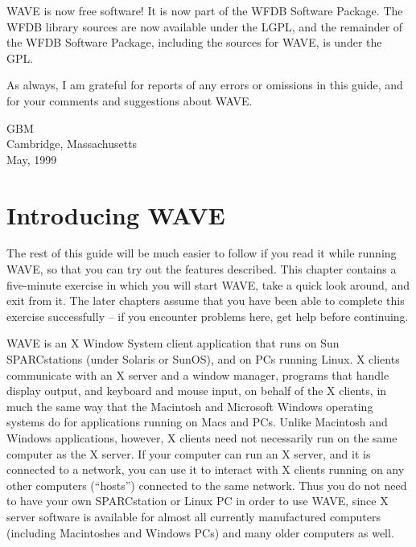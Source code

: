 \documentclass[twoside]{book}
\newcommand{\WAVE}{{\sf WAVE}\xspace}
\begin{document}
\WAVE{} is now free software!  It is now part of the WFDB Software
Package.  The WFDB library sources are now available under the LGPL,
and the remainder of the WFDB Software Package, including the sources
for \WAVE{}, is under the GPL.

As always, I am grateful for reports of any errors or omissions in this
guide, and for your comments and suggestions about \WAVE{}.

\vspace{2em}
\noindent
GBM\\
Cambridge, Massachusetts\\
May, 1999

\chapter{Introducing \WAVE{}}

The rest of this guide will be much easier to follow if you read it
while running \WAVE{}, so that you can try out the features
described.  This chapter contains a five-minute exercise in which you
will start \WAVE{}, take a quick look around, and exit from it.
The later chapters assume that you have been able to complete this
exercise successfully -- if you encounter problems here, get help
before continuing.

\vspace{5mm}


\WAVE{} is an X Window System client application that runs on Sun
SPARCstations (under Solaris or SunOS), and on PCs running Linux.  X
clients communicate with an X server and a window manager, programs
that handle display output, and keyboard and mouse input, on behalf
of the X clients, in much the same way that the Macintosh and
Microsoft Windows operating systems do for applications running on
Macs and PCs.  Unlike Macintosh and Windows applications, however, X
clients need not necessarily run on the same computer as the X server.
If your computer can run an X server, and it is connected to a
network, you can use it to interact with X clients running on any
other computers (``hosts'') connected to the same network.  Thus you
do not need to have your own SPARCstation or Linux PC in order to use
\WAVE{}, since X server software is available for almost all
currently manufactured computers (including Macintoshes and Windows
PCs) and many older computers as well.
\end{document}
